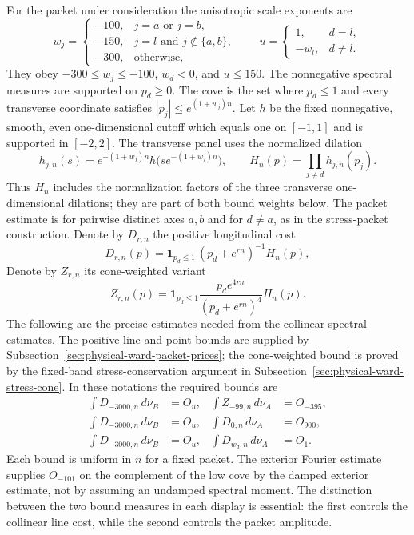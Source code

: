 For the packet under consideration the anisotropic scale exponents are
\[
 w_j=\begin{cases}
 -100,&j=a\text{ or }j=b,\\
 -150,&j=l\text{ and }j\notin\{a,b\},\\
 -300,&\text{otherwise},
 \end{cases}
 \qquad
 u=\begin{cases}1,&d=l,\\-w_l,&d\ne l.\end{cases}
\]
They obey $-300\leq w_j\leq-100$, $w_d<0$, and $u\leq150$.  The
nonnegative spectral measures are supported on $p_d\geq0$.  The cove is
the set where $p_d\leq1$ and every transverse coordinate satisfies
$|p_j|\leq e^{(1+w_j)n}$.  Let $h$ be the fixed nonnegative, smooth, even
one-dimensional cutoff which equals one on $[-1,1]$ and is supported in
$[-2,2]$.  The transverse panel uses
the normalized dilation
\[
 h_{j,n}(s)=e^{-(1+w_j)n}h\bigl(s e^{-(1+w_j)n}\bigr),
 \qquad H_n(p)=\prod_{j\ne d}h_{j,n}(p_j).
\]
Thus $H_n$ includes the normalization factors of the three transverse
one-dimensional dilations; they are part of both bound weights below.
The packet estimate is for pairwise distinct axes $a,b$ and for
$d\ne a$, as in the stress-packet construction.  Denote by $D_{r,n}$ the
positive longitudinal cost
\[
 D_{r,n}(p)=\mathbf1_{p_d\leq1}\,(p_d+e^{rn})^{-1}
             H_n(p),
\]
Denote by $Z_{r,n}$ its cone-weighted variant
\[
 Z_{r,n}(p)=\mathbf1_{p_d\leq1}
     \frac{p_d e^{4rn}}{(p_d+e^{rn})^4}H_n(p).
\]
The following are the precise estimates needed from the collinear
spectral estimates.  The positive line and point bounds are supplied by
Subsection~\ref{sec:physical-ward-packet-prices}; the cone-weighted bound is
proved by the fixed-band stress-conservation argument in
Subsection~\ref{sec:physical-ward-stress-cone}.  In these notations the
required bounds are
\begin{align}
 \int D_{-3000,n}\,d\nu_B&=O_u,&
 \int Z_{-99,n}\,d\nu_A&=O_{-395},
 \label{eq:ward-deep-prices}\\
 \int D_{-3000,n}\,d\nu_B&=O_u,&
 \int D_{0,n}\,d\nu_A&=O_{900},
 \label{eq:ward-shallow-prices}\\
 \int D_{-3000,n}\,d\nu_B&=O_u,&
 \int D_{w_d,n}\,d\nu_A&=O_1.
 \label{eq:ward-side-prices}
\end{align}
Each bound is uniform in $n$ for a fixed packet.  The exterior Fourier
estimate supplies $O_{-101}$ on the complement of the low cove by the
damped exterior estimate, not by assuming an undamped spectral moment.  The
distinction between the two bound measures in each display is essential:
the first controls the collinear line cost, while the second controls the
packet amplitude.

